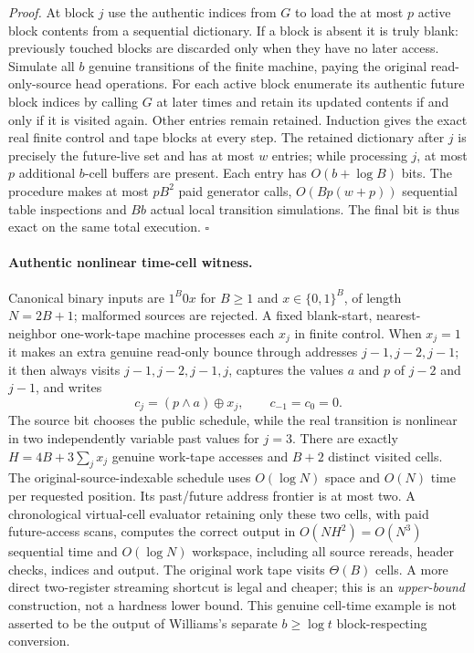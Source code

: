 \documentclass[11pt]{article}
\begin{document}
\emph{Proof.}
At block $j$ use the authentic indices from $G$ to load the
at most $p$ active block contents from a sequential dictionary.
If a block is absent it is truly blank: previously touched
blocks are discarded only when they have no later access.
Simulate all $b$ genuine transitions of the finite machine,
paying the original read-only-source head operations. For each
active block enumerate its authentic future block indices by
calling $G$ at later times and retain its updated contents if
and only if it is visited again. Other entries remain retained.
Induction gives the exact real finite control and tape blocks
at every step. The retained dictionary after $j$ is precisely
the future-live set and has at most $w$ entries; while processing
$j$, at most $p$ additional $b$-cell buffers are present.
Each entry has $O(b+\log B)$ bits. The procedure makes at most
$pB^2$ paid generator calls, $O(Bp(w+p))$ sequential table
inspections and $Bb$ actual local transition simulations.
The final bit is thus exact on the same total execution. $\square$

\paragraph{Authentic nonlinear time-cell witness.}
Canonical binary inputs are $1^B0x$ for $B\ge1$ and
$x\in\{0,1\}^{B}$, of length $N=2B+1$; malformed sources
are rejected. A fixed blank-start, nearest-neighbor one-work-tape
machine processes each $x_j$ in finite control. When $x_j=1$
it makes an extra genuine read-only bounce through addresses
$j-1,j-2,j-1$; it then always visits
$j-1,j-2,j-1,j$, captures the values $a$ and $p$ of
$j-2$ and $j-1$, and writes
\[
c_j=(p\land a)\oplus x_j,\qquad c_{-1}=c_0=0.
\]
The source bit chooses the public schedule, while the real
transition is nonlinear in two independently variable past
values for $j=3$. There are exactly
$H=4B+3\sum_jx_j$ genuine work-tape accesses and $B+2$
distinct visited cells. The original-source-indexable schedule
uses $O(\log N)$ space and $O(N)$ time per requested position.
Its past/future address frontier is at most two. A chronological
virtual-cell evaluator retaining only these two cells, with
paid future-access scans, computes the correct output in
$O(NH^2)=O(N^3)$ sequential time and $O(\log N)$ workspace,
including all source rereads, header checks, indices and
output. The original work tape visits $\Theta(B)$ cells.
A more direct two-register streaming shortcut is legal and
cheaper; this is an \emph{upper-bound} construction, not
a hardness lower bound. This genuine cell-time example is not
asserted to be the output of Williams's separate
$b\ge\log t$ block-respecting conversion.
\end{document}
